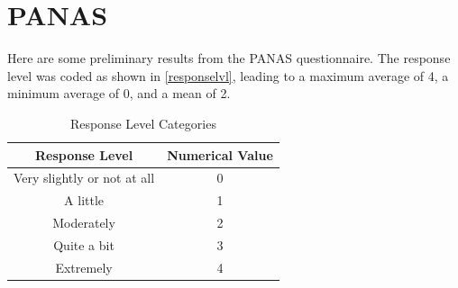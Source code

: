 
\section{PANAS}

Here are some preliminary results from the PANAS questionnaire. The response level was coded as shown in \autoref{responselvl}, leading to a maximum average of 4, a minimum average of 0, and a mean of 2.


\begin{table}[htbp] %
    \centering
    \caption{Response Level Categories}
    \begin{tabular}{|c|c|}
        \hline
        \textbf{Response Level} & \textbf{Numerical Value} \\
        \hline
        Very slightly or not at all & 0 \\
        A little & 1 \\
        Moderately & 2 \\
        Quite a bit & 3 \\
        Extremely & 4 \\
        \hline
    \end{tabular}
    \label{responselvl}
\end{table} %

